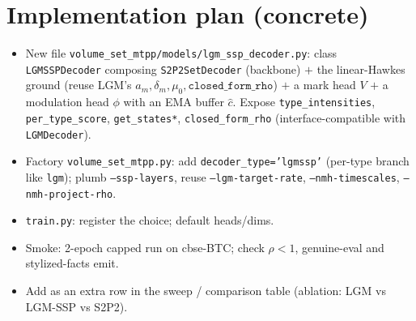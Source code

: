 \documentclass[11pt]{article}
\begin{document}
\section{Implementation plan (concrete)}
\begin{itemize}\itemsep1pt
\item New file \texttt{volume\_set\_mtpp/models/lgm\_ssp\_decoder.py}: class \texttt{LGMSSPDecoder}
  composing \texttt{S2P2SetDecoder} (backbone) $+$ the linear-Hawkes ground (reuse LGM's
  $a_m,\delta_m,\mu_0,\texttt{closed\_form\_rho}$) $+$ a mark head $V$ $+$ a modulation head $\phi$ with
  an EMA buffer $\hat c$. Expose \texttt{type\_intensities}, \texttt{per\_type\_score},
  \texttt{get\_states*}, \texttt{closed\_form\_rho} (interface-compatible with \texttt{LGMDecoder}).
\item Factory \texttt{volume\_set\_mtpp.py}: add \texttt{decoder\_type='lgmssp'} (per-type branch like
  \texttt{lgm}); plumb \texttt{--ssp-layers}, reuse \texttt{--lgm-target-rate},
  \texttt{--nmh-timescales}, \texttt{--nmh-project-rho}.
\item \texttt{train.py}: register the choice; default heads/dims.
\item Smoke: 2-epoch capped run on cbse-BTC; check $\rho<1$, genuine-eval and stylized-facts emit.
\item Add as an extra row in the sweep / comparison table (ablation: LGM vs LGM-SSP vs S2P2).
\end{itemize}
\end{document}
